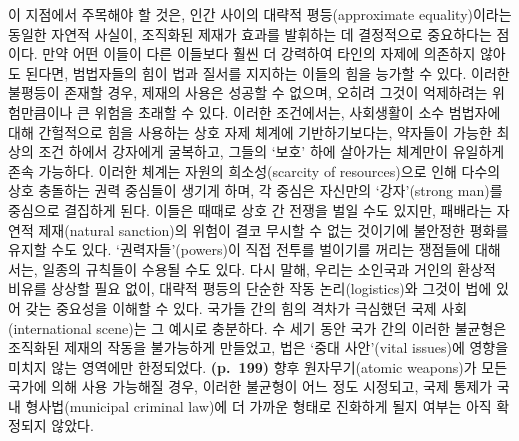 이 지점에서 주목해야 할 것은, 인간 사이의 대략적 평등(approximate
equality)이라는 동일한 자연적 사실이, 조직화된 제재가 효과를 발휘하는 데
결정적으로 중요하다는 점이다. 만약 어떤 이들이 다른 이들보다 훨씬 더
강력하여 타인의 자제에 의존하지 않아도 된다면, 범법자들의 힘이 법과
질서를 지지하는 이들의 힘을 능가할 수 있다. 이러한 불평등이 존재할 경우,
제재의 사용은 성공할 수 없으며, 오히려 그것이 억제하려는 위험만큼이나 큰
위험을 초래할 수 있다. 이러한 조건에서는, 사회생활이 소수 범법자에 대해
간헐적으로 힘을 사용하는 상호 자제 체계에 기반하기보다는, 약자들이
가능한 최상의 조건 하에서 강자에게 굴복하고, 그들의 `보호' 하에 살아가는
체계만이 유일하게 존속 가능하다. 이러한 체계는 자원의 희소성(scarcity of
resources)으로 인해 다수의 상호 충돌하는 권력 중심들이 생기게 하며, 각
중심은 자신만의 `강자'(strong man)를 중심으로 결집하게 된다. 이들은
때때로 상호 간 전쟁을 벌일 수도 있지만, 패배라는 자연적 제재(natural
sanction)의 위험이 결코 무시할 수 없는 것이기에 불안정한 평화를 유지할
수도 있다. `권력자들'(powers)이 직접 전투를 벌이기를 꺼리는 쟁점들에
대해서는, 일종의 규칙들이 수용될 수도 있다. 다시 말해, 우리는 소인국과
거인의 환상적 비유를 상상할 필요 없이, 대략적 평등의 단순한 작동
논리(logistics)와 그것이 법에 있어 갖는 중요성을 이해할 수 있다. 국가들
간의 힘의 격차가 극심했던 국제 사회(international scene)는 그 예시로
충분하다. 수 세기 동안 국가 간의 이러한 불균형은 조직화된 제재의 작동을
불가능하게 만들었고, 법은 `중대 사안'(vital issues)에 영향을 미치지 않는
영역에만 한정되었다. \textbf{(p.~199)} 향후 원자무기(atomic weapons)가
모든 국가에 의해 사용 가능해질 경우, 이러한 불균형이 어느 정도 시정되고,
국제 통제가 국내 형사법(municipal criminal law)에 더 가까운 형태로
진화하게 될지 여부는 아직 확정되지 않았다.

